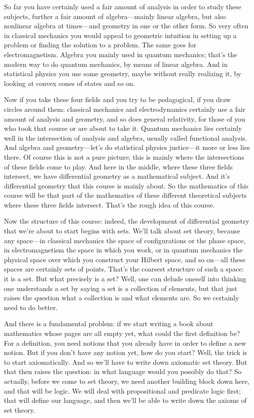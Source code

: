 So far you have certainly used a fair amount of analysis in order to study these subjects, further a fair amount of algebra---mainly linear algebra, but also nonlinear algebra at times---and geometry in one or the other form. So very often in classical mechanics you would appeal to geometric intuition in setting up a problem or finding the solution to a problem. The same goes for electromagnetism. Algebra you mainly used in quantum mechanics; that's the modern way to do quantum mechanics, by means of linear algebra. And in statistical physics you use some geometry, maybe without really realizing it, by looking at convex cones of states and so on.

Now if you take these four fields and you try to be pedagogical, if you draw circles around them: classical mechanics and electrodynamics certainly use a fair amount of analysis and geometry, and so does general relativity, for those of you who took that course or are about to take it. Quantum mechanics lies certainly well in the intersection of analysis and algebra, usually called functional analysis. And algebra and geometry---let's do statistical physics justice---it more or less lies there. Of course this is not a pure picture; this is mainly where the intersections of these fields come to play. And here in the middle, where these three fields intersect, we have differential geometry as a mathematical subject. And it's differential geometry that this course is mainly about. So the mathematics of this course will be that part of the mathematics of these different theoretical subjects where these three fields intersect. That's the rough idea of this course.

Now the structure of this course: indeed, the development of differential geometry that we're about to start begins with sets. We'll talk about set theory, because any space---in classical mechanics the space of configurations or the phase space, in electromagnetism the space in which you work, or in quantum mechanics the physical space over which you construct your Hilbert space, and so on---all these spaces are certainly sets of points. That's the coarsest structure of such a space: it is a set. But what precisely is a set? Well, one can delude oneself into thinking one understands a set by saying a set is a collection of elements, but that just raises the question what a collection is and what elements are. So we certainly need to do better.

And there is a fundamental problem: if we start writing a book about mathematics whose pages are all empty yet, what could the first definition be? For a definition, you need notions that you already have in order to define a new notion. But if you don't have any notion yet, how do you start? Well, the trick is to start axiomatically. And so we'll have to write down axiomatic set theory. But that then raises the question: in what language would you possibly do that? So actually, before we come to set theory, we need another building block down here, and that will be logic. We will deal with propositional and predicate logic first; that will define our language, and then we'll be able to write down the axioms of set theory.

